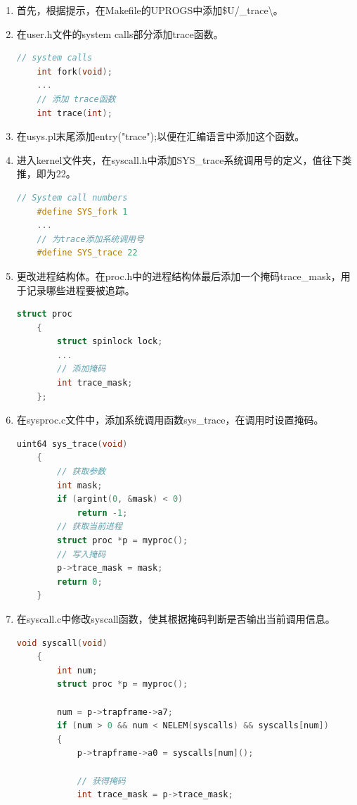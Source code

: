 \begin{enumerate}
    \item 首先，根据提示，在Makefile的UPROGS中添加\$U/\_trace\textbackslash。
    \item 在user.h文件的system calls部分添加trace函数。
          \newpage
          \begin{lstlisting}[language=c, title=对user.h的改动]
    // system calls
    int fork(void);
    ...
    // 添加 trace函数
    int trace(int);
    \end{lstlisting}
    \item 在usys.pl末尾添加entry("trace");以便在汇编语言中添加这个函数。
    \item 进入kernel文件夹，在syscall.h中添加SYS\_trace系统调用号的定义，值往下类推，即为22。
          \begin{lstlisting}[language=c, title=对syscall.h的更改]
    // System call numbers
    #define SYS_fork 1
    ...
    // 为trace添加系统调用号
    #define SYS_trace 22
          \end{lstlisting}
    \item 更改进程结构体。在proc.h中的进程结构体最后添加一个掩码trace\_mask，用于记录哪些进程要被追踪。
          \begin{lstlisting}[language=c, title=对进程结构体的更改]
    struct proc
    {
        struct spinlock lock;
        ...
        // 添加掩码
        int trace_mask;
    };
    \end{lstlisting}
    \item 在sysproc.c文件中，添加系统调用函数sys\_trace，在调用时设置掩码。
          \begin{lstlisting}[language=c, title=实现sys\_trace系统调用]
    uint64 sys_trace(void)
    {
        // 获取参数
        int mask;
        if (argint(0, &mask) < 0)
            return -1;
        // 获取当前进程
        struct proc *p = myproc();
        // 写入掩码
        p->trace_mask = mask;
        return 0;
    }
    \end{lstlisting}
    \item 在syscall.c中修改syscall函数，使其根据掩码判断是否输出当前调用信息。
          \begin{lstlisting}[language=c, title=对syscall函数的修改]
    void syscall(void)
    {
        int num;
        struct proc *p = myproc();

        num = p->trapframe->a7;
        if (num > 0 && num < NELEM(syscalls) && syscalls[num])
        {
            p->trapframe->a0 = syscalls[num]();

            // 获得掩码
            int trace_mask = p->trace_mask;


\end{lstlisting}
\end{enumerate}
